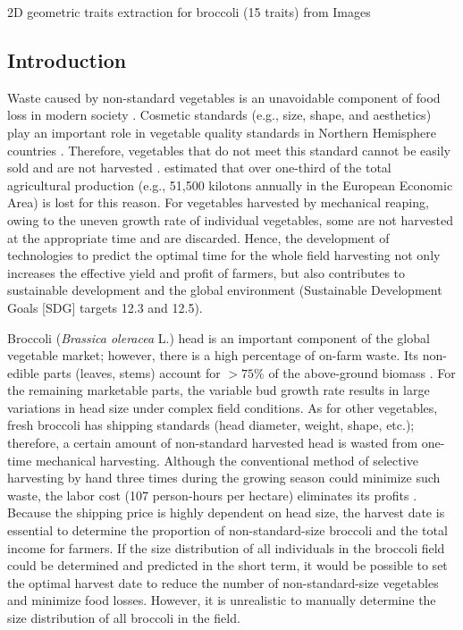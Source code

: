 2D geometric traits extraction for broccoli (15 traits) from Images

\subsection{Introduction}

Waste caused by non-standard vegetables is an unavoidable component of food loss in modern society \citep{parfitt_food_2010,teuber_food_2016}. Cosmetic standards (e.g., size, shape, and aesthetics) play an important role in vegetable quality standards in Northern Hemisphere countries \citep{porter_avoidable_2018}. Therefore, vegetables that do not meet this standard cannot be easily sold and are not harvested \citep{garrone_opening_2014}. \citet{porter_avoidable_2018} estimated that over one-third of the total agricultural production (e.g., 51,500 kilotons annually in the European Economic Area) is lost for this reason. For vegetables harvested by mechanical reaping, owing to the uneven growth rate of individual vegetables, some are not harvested at the appropriate time and are discarded. Hence, the development of technologies to predict the optimal time for the whole field harvesting not only increases the effective yield and profit of farmers, but also contributes to sustainable development and the global environment (Sustainable Development Goals [SDG] targets 12.3 and 12.5).

Broccoli (\textit{Brassica oleracea} L.) head is an important component of the global vegetable market; however, there is a high percentage of on-farm waste. Its non-edible parts (leaves, stems) account for $> 75\%$ of the above-ground biomass \citep[Table~1]{fink_nitrogen_1999}. For the remaining marketable parts, the variable bud growth rate results in large variations in head size under complex field conditions. As for other vegetables, fresh broccoli has shipping standards (head diameter, weight, shape, etc.); therefore, a certain amount of non-standard harvested head is wasted from one-time mechanical harvesting. Although the conventional method of selective harvesting by hand three times during the growing season could minimize such waste, the labor cost (107 person-hours per hectare) eliminates its profits \citep{blok_effect_2021}. Because the shipping price is highly dependent on head size, the harvest date is essential to determine the proportion of non-standard-size broccoli and the total income for farmers. If the size distribution of all individuals in the broccoli field could be determined and predicted in the short term, it would be possible to set the optimal harvest date to reduce the number of non-standard-size vegetables and minimize food losses. However, it is unrealistic to manually determine the size distribution of all broccoli in the field.

